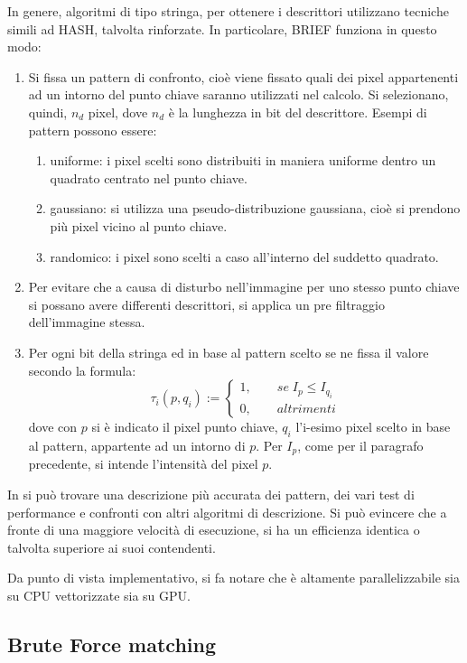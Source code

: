 In genere, algoritmi di tipo stringa, per ottenere i descrittori utilizzano tecniche simili ad HASH, talvolta rinforzate. In particolare, BRIEF funziona in questo modo:
\begin{enumerate}
	\item Si fissa un pattern di confronto, cioè viene fissato quali dei pixel appartenenti ad un intorno del punto chiave saranno utilizzati nel calcolo. Si selezionano, quindi, $n_d$ pixel, dove $n_d$ è la lunghezza in bit del descrittore. Esempi di pattern possono essere:
	\begin{enumerate}
		\item uniforme: i pixel scelti sono distribuiti in maniera uniforme dentro un quadrato centrato nel punto chiave. 
		\item gaussiano: si utilizza una pseudo-distribuzione gaussiana, cioè si prendono più pixel vicino al punto chiave.
		\item randomico: i pixel sono scelti a caso all'interno del suddetto quadrato.
	\end{enumerate}
	\item Per evitare che a causa di disturbo nell'immagine per uno stesso punto chiave si possano avere differenti descrittori, si applica un pre filtraggio dell'immagine stessa.
	\item Per ogni bit della stringa ed in base al pattern scelto se ne fissa il valore secondo la formula:
	\begin{equation}
		\tau_i(p, q_i) := \begin{cases}
		1, \qquad se \; I_p \leq I_{q_i}\\
		0, \qquad altrimenti
		\end{cases}
	\end{equation}
	dove con $p$ si è indicato il pixel punto chiave, $q_i$ l'i-esimo pixel scelto in base al pattern, appartente ad un intorno di $p$. Per $I_p$, come per il paragrafo precedente, si intende l'intensità del pixel $p$.
\end{enumerate}

In \cite{bib4} si può trovare una descrizione più accurata dei pattern, dei vari test di performance e confronti con altri algoritmi di descrizione. Si può evincere che a fronte di una maggiore velocità di esecuzione, si ha un efficienza identica o talvolta superiore ai suoi contendenti.

Da punto di vista implementativo, si fa notare che è altamente parallelizzabile sia su CPU vettorizzate sia su GPU.
\subsection{Brute Force matching}
\label{sec:det:bmmatch}

